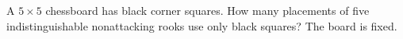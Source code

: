 A $5\times5$ chessboard has black corner squares. How many placements of five indistinguishable nonattacking rooks use only black squares? The board is fixed.
